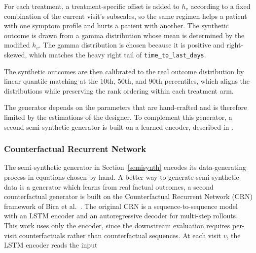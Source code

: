 \documentclass{article}
\begin{document}
For each treatment, a treatment-specific offset is added to $h_v$
according to a fixed combination of the current visit's subscales,
so the same regimen helps a patient with one symptom profile and
hurts a patient with another. The synthetic outcome is drawn from a
gamma distribution whose mean is determined by the modified $h_v$.
The gamma distribution is chosen because it is positive and
right-skewed, which matches the heavy right tail of
\texttt{time\_to\_last\_days}.

The synthetic outcomes are then calibrated to the real outcome distribution by linear quantile matching at the 10th, 50th, and 90th percentiles, which aligns the distributions while preserving the rank ordering within each treatment arm.

The generator depends on the parameters that are hand-crafted and is therefore limited by the estimations of the designer. To complement this generator, a second semi-synthetic
generator is built on a learned encoder, described in
.


\subsubsection{Counterfactual Recurrent Network}
\label{sec:crn}
The semi-synthetic generator in Section~\ref{semisynth} encodes its
data-generating process in equations chosen by hand. A better way to generate semi-synthetic data is a generator which learns from real factual outcomes,
a second counterfactual generator is built on the Counterfactual
Recurrent Network (CRN) framework of
Bica et al.~\cite{bica2020estimatingcounterfactualtreatmentoutcomes}.
The original CRN is a sequence-to-sequence model with an LSTM encoder
and an autoregressive decoder for multi-step rollouts. This work uses
only the encoder, since the downstream evaluation requires per-visit
counterfactuals rather than counterfactual sequences. \newline
At each visit $v$, the LSTM encoder reads the input
\end{document}

